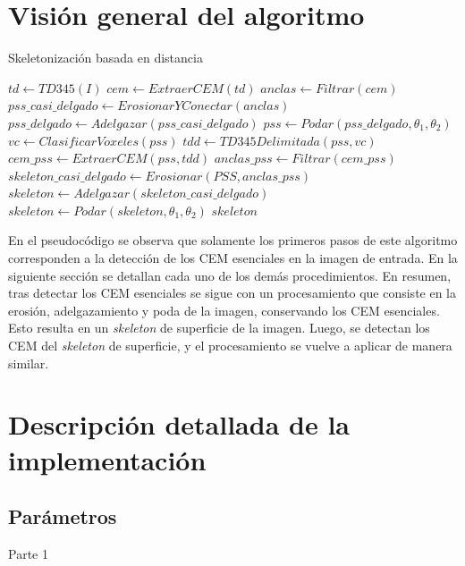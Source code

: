 \section{Visión general del algoritmo}

\begin{algorithm}[H]
\caption{Skeletonización basada en distancia}
\label{alg:ddskel}
\begin{algorithmic}[1]
	\State $td \gets TD345(I)$
    \State $cem \gets ExtraerCEM(td)$
    \State $anclas \gets Filtrar(cem)$
    \State $pss\_casi\_delgado \gets ErosionarYConectar(anclas)$
    \State $pss\_delgado \gets Adelgazar(pss\_casi\_delgado)$
    \State $pss \gets Podar(pss\_delgado, \theta_1, \theta_2)$ \label{ddprune1}
    \State $vc \gets ClasificarVoxeles(pss)$
    \State $tdd \gets TD345Delimitada(pss, vc)$
    \State $cem\_pss \gets ExtraerCEM(pss, tdd)$
    \State $anclas\_pss \gets Filtrar(cem\_pss)$
    \State $skeleton\_casi\_delgado \gets Erosionar(PSS, anclas\_pss)$
    \State $skeleton \gets Adelgazar(skeleton\_casi\_delgado)$
    \State $skeleton \gets Podar(skeleton, \theta_1, \theta_2)$ \label{ddprune2}
    \State \Return $skeleton$
\EndFunction
\end{algorithmic}
\end{algorithm}

En el pseudocódigo se observa que solamente los primeros pasos de este algoritmo corresponden a la detección de los CEM esenciales en la imagen de entrada. En la siguiente sección se detallan cada uno de los demás procedimientos. En resumen, tras detectar los CEM esenciales se sigue con un procesamiento que consiste en la erosión, adelgazamiento y poda de la imagen, conservando los CEM esenciales. Esto resulta en un \textit{skeleton} de superficie de la imagen. Luego, se detectan los CEM del \textit{skeleton} de superficie, y el procesamiento se vuelve a aplicar de manera similar.

\section{Descripción detallada de la implementación}

\subsection{Parámetros}

\begin{algorithm}[H]
\addtocounter{algorithm}{-1}
\caption{Parte 1}
\begin{algorithmic}[1]
\end{algorithmic}
\end{algorithm}

